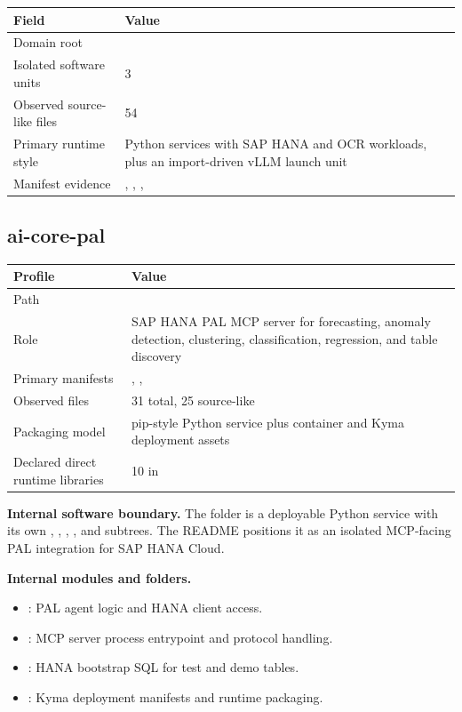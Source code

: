 \documentclass[11pt,a4paper]{article}
\begin{document}
\begin{tabular}{@{}P{4.2cm}P{9.8cm}@{}}
\toprule
\textbf{Field} & \textbf{Value} \\
\midrule
Domain root &  \\
Isolated software units & 3 \\
Observed source-like files & 54 \\
Primary runtime style & Python services with SAP HANA and OCR workloads, plus an import-driven vLLM launch unit \\
Manifest evidence & , , ,  \\
\bottomrule
\end{tabular}

\subsection{ai-core-pal}

\begin{tabular}{@{}P{4.2cm}P{9.8cm}@{}}
\toprule
\textbf{Profile} & \textbf{Value} \\
\midrule
Path &  \\
Role & SAP HANA PAL MCP server for forecasting, anomaly detection, clustering, classification, regression, and table discovery \\
Primary manifests & , ,  \\
Observed files & 31 total, 25 source-like \\
Packaging model & pip-style Python service plus container and Kyma deployment assets \\
Declared direct runtime libraries & 10 in  \\
\bottomrule
\end{tabular}

\textbf{Internal software boundary.} The folder is a deployable Python service with its own , , , , and  subtrees. The README positions it as an isolated MCP-facing PAL integration for SAP HANA Cloud.

\textbf{Internal modules and folders.}
\begin{itemize}[leftmargin=*]
    \item {}: PAL agent logic and HANA client access.
    \item {}: MCP server process entrypoint and protocol handling.
    \item {}: HANA bootstrap SQL for test and demo tables.
    \item {}: Kyma deployment manifests and runtime packaging.
\end{itemize}
\end{document}

